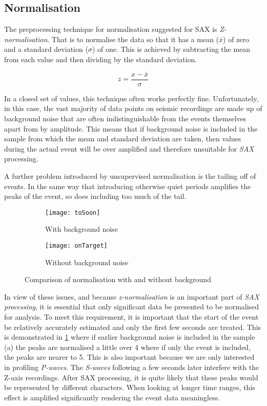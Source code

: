 \documentclass[../report.tex]{subfiles}
\begin{document}
	
\subsection{Normalisation} \label{sec:Z-normalisation}
	The preprocessing technique for normalisation suggested for SAX \citep{sax} is \textit{Z-normalisation}.  That is to normalise the data so that it has a mean ($\bar{x}$) of zero and a standard deviation ($\sigma$) of one.  This is achieved by subtracting the mean from each value and then dividing by the standard deviation.
	
	\begin{equation}
	z = \dfrac{x - \bar{x}}{\sigma}
	\end{equation}
	
	In a closed set of values, this technique often works perfectly fine.  Unfortunately, in this case, the vast majority of data points on seismic recordings are made up of background noise that are often indistinguishable from the events themselves apart from by amplitude.  This means that if background noise is included in the sample from which the mean and standard deviation are taken, then values during the actual event will be over amplified and therefore unsuitable for \textit{SAX} processing.
	
	A further problem introduced by unsupervised normalisation is the tailing off of events.  In the same way that introducing otherwise quiet periods amplifies the peaks of the event, so does including too much of the tail.
	
\begin{figure}[h]
	\begin{subfigure}{\textwidth}
		\centering
		\texttt{[image: toSoon]}
		\caption[]{With background noise}
	\end{subfigure}
	\begin{subfigure}{\textwidth}
		\centering
		\texttt{[image: onTarget]}
		\caption[]{Without background noise}
	\end{subfigure}
	\caption{Comparison of normalisation with and without background}
	\label{fig:tosoon}
\end{figure}

	In view of these issues, and because \textit{z-normalisation} is an important part of \textit{SAX processing}, it is essential that only significant data be presented to be normalised for analysis.  To meet this requirement, it is important that the start of the event be relatively accurately estimated and only the first few seconds are treated.  This is demonstrated in \cref{fig:tosoon} where if earlier background noise is included in the sample (a) the peaks are normalised a little over 4 where if only the event is included, the peaks are nearer to 5.  This is also important because we are only interested in profiling \textit{P-waves}. The \textit{S-waves} following a few seconds later interfere with the Z-axis recordings.  After SAX processing, it is quite likely that these peaks would be represented by different characters.  When looking at longer time ranges, this effect is amplified significantly rendering the event data meaningless.
\end{document}
